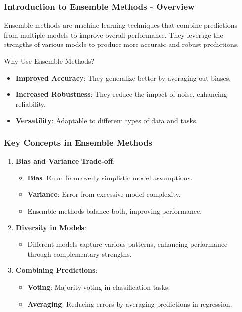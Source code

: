 \documentclass[aspectratio=169]{beamer}
\begin{document}
\begin{frame}[fragile]
    \frametitle{Introduction to Ensemble Methods - Overview}
    Ensemble methods are machine learning techniques that combine predictions from multiple models to improve overall performance. 
    They leverage the strengths of various models to produce more accurate and robust predictions.
    
    \begin{block}{Why Use Ensemble Methods?}
        \begin{itemize}
            \item \textbf{Improved Accuracy}: They generalize better by averaging out biases.
            \item \textbf{Increased Robustness}: They reduce the impact of noise, enhancing reliability.
            \item \textbf{Versatility}: Adaptable to different types of data and tasks.
        \end{itemize}
    \end{block}
\end{frame}

\begin{frame}[fragile]
    \frametitle{Key Concepts in Ensemble Methods}
    
    \begin{enumerate}
        \item \textbf{Bias and Variance Trade-off}:
            \begin{itemize}
                \item \textbf{Bias}: Error from overly simplistic model assumptions.
                \item \textbf{Variance}: Error from excessive model complexity.
                \item Ensemble methods balance both, improving performance.
            \end{itemize}
        
        \item \textbf{Diversity in Models}:
            \begin{itemize}
                \item Different models capture various patterns, enhancing performance through complementary strengths.
            \end{itemize}
        
        \item \textbf{Combining Predictions}:
            \begin{itemize}
                \item \textbf{Voting}: Majority voting in classification tasks.
                \item \textbf{Averaging}: Reducing errors by averaging predictions in regression.
            \end{itemize}
    \end{enumerate}
\end{frame}
\end{document}

